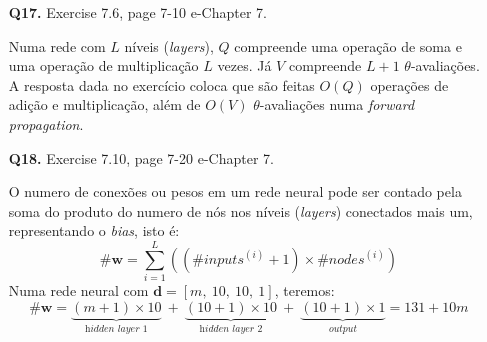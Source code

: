 \documentclass[12pt]{article}
\begin{document}
\begin{enumerate}
\pagebreak

\item [\textbf{Q17.}] Exercise 7.6, page 7-10 e-Chapter 7.
	\begin{addmargin}[1em]{2em}
		Numa rede com $L$ níveis (\textit{layers}), $Q$ compreende uma operação de soma e uma operação de multiplicação $L$ vezes. Já $V$ compreende $L+1$ $\theta$-avaliações.\\
		A resposta dada no exercício coloca que são feitas $O(Q)$ operações de adição e multiplicação, além de $O(V)$ $\theta$-avaliações numa \textit{forward propagation}.
	\end{addmargin}
\item [\textbf{Q18.}] Exercise 7.10, page 7-20 e-Chapter 7.
	\begin{addmargin}[1em]{2em}
		O numero de conexões ou pesos em um rede neural pode ser contado pela soma do produto do numero de nós nos níveis (\textit{layers}) conectados mais um, representando o \textit{bias}, isto é: \[\#\mathbf{w}= \sum_{i=1}^{L} \left( (\#inputs^{(i)} + 1) \times \#nodes^{(i)} \right) \] 
		Numa rede neural com $\mathbf{d} = [m,\ 10,\ 10,\ 1]$, teremos: \[\#\mathbf{w} = \underbrace{(m + 1) \times 10}_\textit{hidden layer 1}\ +\ \underbrace{(10 + 1) \times 10}_\textit{hidden layer 2}\ +\ \underbrace{(10 + 1) \times 1}_\textit{output} = 131 + 10m\]
	\end{addmargin}	

\pagebreak


\end{enumerate}
\end{document}
